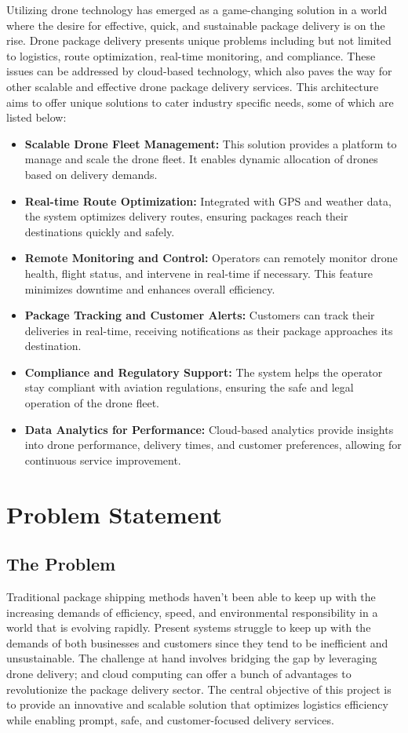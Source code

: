\documentclass{article}
\begin{document}
Utilizing drone technology has emerged as a game-changing solution in a world where the desire for effective, quick, and sustainable package delivery is on the rise. Drone package delivery presents unique problems including but not limited to logistics, route optimization, real-time monitoring, and compliance. These issues can be addressed by cloud-based technology, which also paves the way for other scalable and effective drone package delivery services. This architecture aims to offer unique solutions to cater industry specific needs, some of which are listed below:
\begin{itemize}
    \item \textbf{Scalable Drone Fleet Management:} This solution provides a platform to manage and scale the drone fleet. It enables dynamic allocation of drones based on delivery demands.
    \item \textbf{Real-time Route Optimization:} Integrated with GPS and weather data, the system optimizes delivery routes, ensuring packages reach their destinations quickly and safely.
    \item \textbf{Remote Monitoring and Control:} Operators can remotely monitor drone health, flight status, and intervene in real-time if necessary. This feature minimizes downtime and enhances overall efficiency.
    \item \textbf{Package Tracking and Customer Alerts:} Customers can track their deliveries in real-time, receiving notifications as their package approaches its destination.
    \item \textbf{Compliance and Regulatory Support:} The system helps the operator stay compliant with aviation regulations, ensuring the safe and legal operation of the drone fleet.
    \item \textbf{Data Analytics for Performance:} Cloud-based analytics provide insights into drone performance, delivery times, and customer preferences, allowing for continuous service improvement.
\end{itemize}


\newpage
\section{Problem Statement}
\subsection{The Problem}

Traditional package shipping methods haven't been able to keep up with the increasing demands of efficiency, speed, and environmental responsibility in a world that is evolving rapidly. Present systems struggle to keep up with the demands of both businesses and customers since they tend to be inefficient and unsustainable. The challenge at hand involves bridging the gap by leveraging drone delivery; and cloud computing can offer a bunch of advantages to revolutionize the package delivery sector. The central objective of this project is to provide an innovative and scalable solution that optimizes logistics efficiency while enabling prompt, safe, and customer-focused delivery services.
\end{document}
